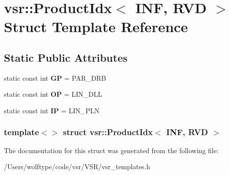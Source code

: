 \hypertarget{structvsr_1_1_product_idx_3_01_i_n_f_00_01_r_v_d_01_4}{\section{vsr\-:\-:Product\-Idx$<$ I\-N\-F, R\-V\-D $>$ Struct Template Reference}
\label{structvsr_1_1_product_idx_3_01_i_n_f_00_01_r_v_d_01_4}
}
\subsection*{Static Public Attributes}
\begin{DoxyCompactItemize}
\item 
\hypertarget{structvsr_1_1_product_idx_3_01_i_n_f_00_01_r_v_d_01_4_a712f1bba85661e443f7c744ac87db87d}{static const int {\bfseries G\-P} = P\-A\-R\-\_\-\-D\-R\-B}\label{structvsr_1_1_product_idx_3_01_i_n_f_00_01_r_v_d_01_4_a712f1bba85661e443f7c744ac87db87d}

\item 
\hypertarget{structvsr_1_1_product_idx_3_01_i_n_f_00_01_r_v_d_01_4_a8cbb59576410b3b8fa381a97f8227525}{static const int {\bfseries O\-P} = L\-I\-N\-\_\-\-D\-L\-L}\label{structvsr_1_1_product_idx_3_01_i_n_f_00_01_r_v_d_01_4_a8cbb59576410b3b8fa381a97f8227525}

\item 
\hypertarget{structvsr_1_1_product_idx_3_01_i_n_f_00_01_r_v_d_01_4_ab36251732891fa842422c3d2e2dd0794}{static const int {\bfseries I\-P} = L\-I\-N\-\_\-\-P\-L\-N}\label{structvsr_1_1_product_idx_3_01_i_n_f_00_01_r_v_d_01_4_ab36251732891fa842422c3d2e2dd0794}

\end{DoxyCompactItemize}
\subsubsection*{template$<$$>$ struct vsr\-::\-Product\-Idx$<$ I\-N\-F, R\-V\-D $>$}



The documentation for this struct was generated from the following file\-:\begin{DoxyCompactItemize}
\item 
/\-Users/wolftype/code/vsr/\-V\-S\-R/vsr\-\_\-templates.\-h\end{DoxyCompactItemize}
